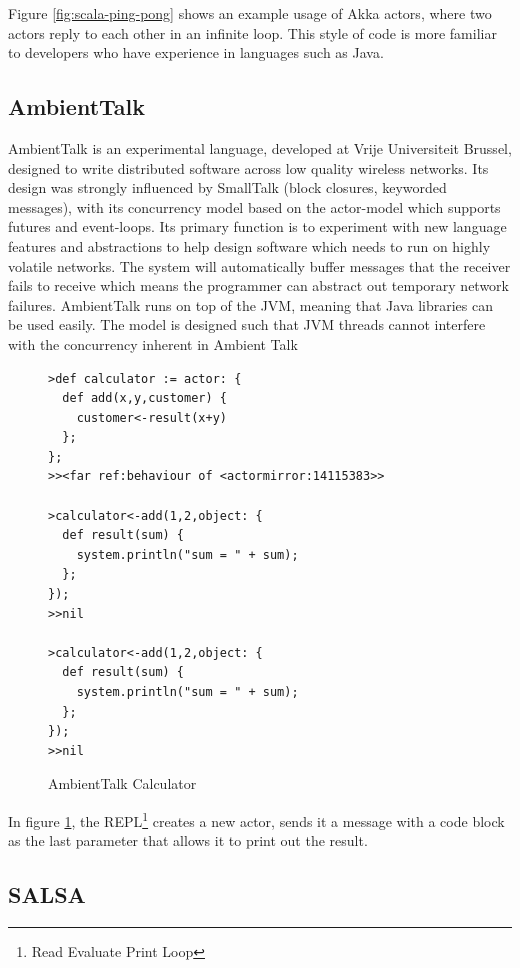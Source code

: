 \documentclass[pdftex,11pt,a4paper]{report}
\begin{document}
Figure \ref{fig:scala-ping-pong} shows an example usage of Akka actors, where two actors reply to each other in an infinite loop.
This style of code is more familiar to developers who have experience in languages such as Java.

\subsection{AmbientTalk}
\label{sec:ambienttalk}

AmbientTalk is an experimental language, developed at Vrije Universiteit Brussel, designed to write distributed software across low quality wireless networks.
Its design was strongly influenced by SmallTalk (block closures, keyworded messages), with its concurrency model based on the actor-model which supports futures and event-loops.
Its primary function is to experiment with new language features and abstractions to help design software which needs to run on highly volatile networks.
The system will automatically buffer messages that the receiver fails to receive which means the programmer can abstract out temporary network failures\cite{ambienttalk-failure}.
AmbientTalk runs on top of the JVM, meaning that Java libraries can be used easily.
The model is designed such that JVM threads cannot interfere with the concurrency inherent in Ambient Talk\cite{ambienttalk-interfere}

\begin{figure}[H]
\begin{verbatim}
>def calculator := actor: {
  def add(x,y,customer) {
    customer<-result(x+y)
  };
};
>><far ref:behaviour of <actormirror:14115383>>

>calculator<-add(1,2,object: {
  def result(sum) {
    system.println("sum = " + sum);
  };
});
>>nil

>calculator<-add(1,2,object: {
  def result(sum) {
    system.println("sum = " + sum);
  };
});
>>nil
\end{verbatim}
\caption{AmbientTalk Calculator\cite{ambienttalk-example}}
\label{fig:ambienttalk-calc}
\end{figure}

In figure \ref{fig:ambienttalk-calc}, the REPL\footnote{Read Evaluate Print Loop} creates a new actor, sends it a message with a code block as the last parameter that allows it to print out the result.

\subsection{SALSA}
\end{document}
